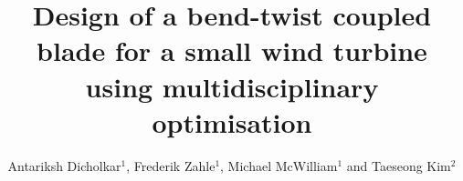 \documentclass[a4paper]{jpconf}
\begin{document}
\title{Design of a bend-twist coupled blade for a small wind turbine using multidisciplinary optimisation}

\author{Antariksh Dicholkar$^1$, Frederik Zahle$^1$, Michael McWilliam$^1$ and Taeseong Kim$^2$}

\address{$^1$ DTU Wind Energy, DTU Ris{\o} campus, Frederiksborgvej 399, DK-4000 Roskilde}

\address{$^2$ DTU Wind Energy, Technical University of Denmark, Nils Koppels All{\'e}, Building 403, DK-2800 Kgs. Lyngby }

\end{document}
